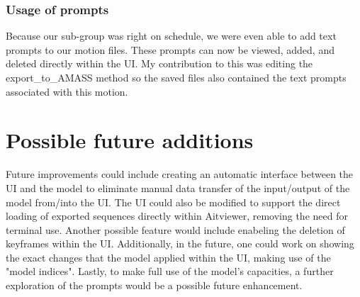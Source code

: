 \documentclass[a4paper]{scrartcl}
\begin{document}
\subsubsection*{Usage of prompts}
Because our sub-group was right on schedule, we were even able to add text prompts to our motion files. These prompts can now be viewed, added, and deleted directly within the UI. My contribution to this was editing the export\_to\_AMASS method so the saved files also contained the text prompts associated with this motion.


\section*{Possible future additions}
Future improvements could include creating an automatic interface between the UI and the model to eliminate manual data transfer of the input/output of the model from/into the UI. The UI could also be modified to support the direct loading of exported sequences directly within Aitviewer, removing the need for terminal use. Another possible feature would include enabeling the deletion of keyframes within the UI. Additionally, in the future, one could work on showing the exact changes that the model applied within the UI, making use of the "model indices". Lastly, to make full use of the model's capacities, a further exploration of the prompts would be a possible future enhancement.
\end{document}
